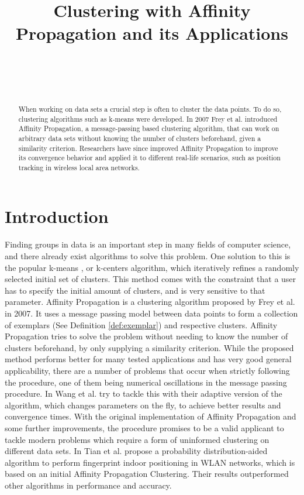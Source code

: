 \documentclass[11pt,a4paper]{article}
\title{Clustering with Affinity Propagation and its Applications}
\author{
 \authorname{Philipp-Alexander Auer} \\
 \studentnumber{01420446} \\
 \curriculum{033 535} \\
\email{e1420446@student.tuwien.ac.at}
}
\begin{document}
\maketitle

\begin{abstract}
	When working on data sets a crucial step is often to cluster the data points. To do so, clustering algorithms such as k-means were developed. In 2007 Frey et al. introduced Affinity Propagation, a message-passing based clustering algorithm, that can work on arbitrary data sets without knowing the number of clusters beforehand, given a similarity criterion. Researchers have since improved Affinity Propagation to improve its convergence behavior and applied it to different real-life scenarios, such as position tracking in wireless local area networks.
\end{abstract}

\section{Introduction}

Finding groups in data is an important step in many fields of computer science, and there already exist algorithms to solve this problem. One solution to this is the popular k-means \cite{hartigan1975clustering}, or k-centers algorithm, which iteratively refines a randomly selected initial set of clusters. This method comes with the constraint that a user has to specify the initial amount of clusters, and is very sensitive to that parameter.
Affinity Propagation \cite{frey2007clustering} is a clustering algorithm proposed by Frey et al. in 2007. It uses a message passing model between data points to form a collection of exemplars (See Definition \ref{def:exemplar}) and respective clusters. Affinity Propagation tries to solve the problem without needing to know the number of clusters beforehand, by only supplying a similarity criterion.
While the proposed method performs better for many tested applications and has very good general applicability, there are a number of problems that occur when strictly following the procedure, one of them being numerical oscillations in the message passing procedure. In \cite{wang2008adaptive} Wang et al. try to tackle this with their adaptive version of the algorithm, which changes parameters on the fly, to achieve better results and convergence times. With the original implementation of Affinity Propagation and some further improvements, the procedure promises to be a valid applicant to tackle modern problems which require a form of uninformed clustering on different data sets. In \cite{tian2013fingerprint} Tian et al. propose a probability distribution-aided algorithm to perform fingerprint indoor positioning in WLAN networks, which is based on an initial Affinity Propagation Clustering. Their results outperformed other algorithms in performance and accuracy.
\end{document}
